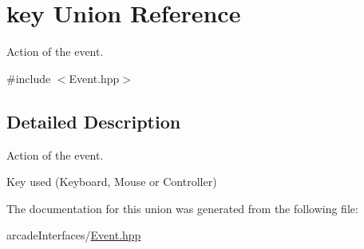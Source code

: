 \hypertarget{unionkey}{}\section{key Union Reference}
\label{unionkey}


Action of the event.  




{\ttfamily \#include $<$Event.\+hpp$>$}



\subsection{Detailed Description}
Action of the event. 

Key used (Keyboard, Mouse or Controller) 

The documentation for this union was generated from the following file\+:\begin{DoxyCompactItemize}
\item 
arcade\+Interfaces/\hyperlink{_event_8hpp}{Event.\+hpp}\end{DoxyCompactItemize}
